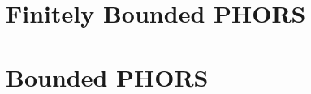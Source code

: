 \documentclass[a4paper,UKenglish,cleveref, autoref, thm-restate]{lipics-v2021}
\begin{document}
\section{Finitely Bounded PHORS}





\section{Bounded PHORS}










\newpage 

\appendix

\end{document}
